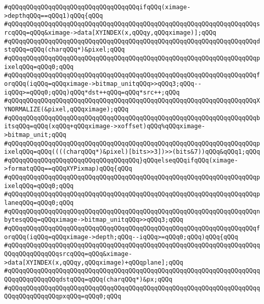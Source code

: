 \verb|#qQQqqQQqqQQqqQQqqQQqqQQqqQQqqQQqqQQqifqQQq(ximage->depthqQQq==qQQq1)qQQq{qQQq|\newline
\verb|#qQQqqQQqqQQqqQQqqQQqqQQqqQQqqQQqqQQqqQQqqQQqqQQqqQQqqQQqqQQqqQQqqQQqsrcqQQq=qQQq&ximage->data[XYINDEX(x,qQQqy,qQQqximage)];qQQq|\newline
\verb|#qQQqqQQqqQQqqQQqqQQqqQQqqQQqqQQqqQQqqQQqqQQqqQQqqQQqqQQqqQQqqQQqqQQqdstqQQq=qQQq(charqQQq*)&pixel;qQQq|\newline
\verb|#qQQqqQQqqQQqqQQqqQQqqQQqqQQqqQQqqQQqqQQqqQQqqQQqqQQqqQQqqQQqqQQqqQQqpixelqQQq=qQQq0;qQQq|\newline
\verb|#qQQqqQQqqQQqqQQqqQQqqQQqqQQqqQQqqQQqqQQqqQQqqQQqqQQqqQQqqQQqqQQqqQQqforqQQq(iqQQq=qQQqximage->bitmap_unitqQQq>>qQQq3;qQQq--iqQQq>=qQQq0;qQQq)qQQq*dst++qQQq=qQQq*src++;qQQq|\newline
\verb|#qQQqqQQqqQQqqQQqqQQqqQQqqQQqqQQqqQQqqQQqqQQqqQQqqQQqqQQqqQQqqQQqqQQqXYNORMALIZE(&pixel,qQQqximage);qQQq|\newline
\verb|#qQQqqQQqqQQqqQQqqQQqqQQqqQQqqQQqqQQqqQQqqQQqqQQqqQQqqQQqqQQqqQQqqQQqbitsqQQq=qQQq(xqQQq+qQQqximage->xoffset)qQQq%qQQqximage->bitmap_unit;qQQq|\newline
\verb|#qQQqqQQqqQQqqQQqqQQqqQQqqQQqqQQqqQQqqQQqqQQqqQQqqQQqqQQqqQQqqQQqqQQqpixelqQQq=qQQq((((charqQQq*)&pixel)[bits>>3])>>(bits&7))qQQq&qQQq1;qQQq|\newline
\verb|#qQQqqQQqqQQqqQQqqQQqqQQqqQQqqQQqqQQq}qQQqelseqQQqifqQQq(ximage->formatqQQq==qQQqXYPixmap)qQQq{qQQq|\newline
\verb|#qQQqqQQqqQQqqQQqqQQqqQQqqQQqqQQqqQQqqQQqqQQqqQQqqQQqqQQqqQQqqQQqqQQqpixelqQQq=qQQq0;qQQq|\newline
\verb|#qQQqqQQqqQQqqQQqqQQqqQQqqQQqqQQqqQQqqQQqqQQqqQQqqQQqqQQqqQQqqQQqqQQqplaneqQQq=qQQq0;qQQq|\newline
\verb|#qQQqqQQqqQQqqQQqqQQqqQQqqQQqqQQqqQQqqQQqqQQqqQQqqQQqqQQqqQQqqQQqqQQqnbytesqQQq=qQQqximage->bitmap_unitqQQq>>qQQq3;qQQq|\newline
\verb|#qQQqqQQqqQQqqQQqqQQqqQQqqQQqqQQqqQQqqQQqqQQqqQQqqQQqqQQqqQQqqQQqqQQqforqQQq(iqQQq=qQQqximage->depth;qQQq--iqQQq>=qQQq0;qQQq)qQQq{qQQq|\newline
\verb|#qQQqqQQqqQQqqQQqqQQqqQQqqQQqqQQqqQQqqQQqqQQqqQQqqQQqqQQqqQQqqQQqqQQqqQQqqQQqqQQqqQQqsrcqQQq=qQQq&ximage->data[XYINDEX(x,qQQqy,qQQqximage)+qQQqplane];qQQq|\newline
\verb|#qQQqqQQqqQQqqQQqqQQqqQQqqQQqqQQqqQQqqQQqqQQqqQQqqQQqqQQqqQQqqQQqqQQqqQQqqQQqqQQqqQQqdstqQQq=qQQq(charqQQq*)&px;qQQq|\newline
\verb|#qQQqqQQqqQQqqQQqqQQqqQQqqQQqqQQqqQQqqQQqqQQqqQQqqQQqqQQqqQQqqQQqqQQqqQQqqQQqqQQqqQQqpxqQQq=qQQq0;qQQq|\newline
